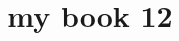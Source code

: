 \documentclass[11pt]{book}
\title{my book 12}
\author{}
\begin{document}
\maketitle
\def\title#1{\chapter{#1}}
\tableofcontents

        
        
\end{document}
